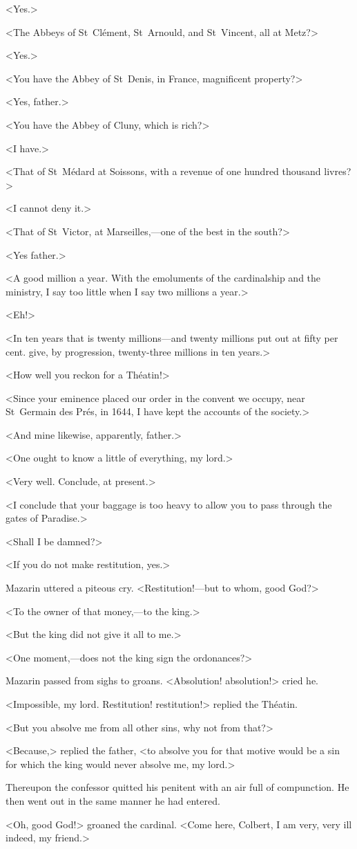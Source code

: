 <Yes.>

<The Abbeys of St~Clément, St~Arnould, and St~Vincent, all at Metz?>

<Yes.>

<You have the Abbey of St~Denis, in France, magnificent property?>

<Yes, father.>

<You have the Abbey of Cluny, which is rich?>

<I have.>

<That of St~Médard at Soissons, with a revenue of one hundred thousand livres?>

<I cannot deny it.>

<That of St~Victor, at Marseilles,—one of the best in the south?>

<Yes father.>

<A good million a year. With the emoluments of the cardinalship and the ministry, I say too little when I say two millions a year.>

<Eh!>

<In ten years that is twenty millions—and twenty millions put out at fifty per cent. give, by progression, twenty-three millions in ten years.>

<How well you reckon for a Théatin!>

<Since your eminence placed our order in the convent we occupy, near St~Germain des Prés, in 1644, I have kept the accounts of the society.>

<And mine likewise, apparently, father.>

<One ought to know a little of everything, my lord.>

<Very well. Conclude, at present.>

<I conclude that your baggage is too heavy to allow you to pass through the gates of Paradise.>

<Shall I be damned?>

<If you do not make restitution, yes.>

Mazarin uttered a piteous cry. <Restitution!—but to whom, good God?>

<To the owner of that money,—to the king.>

<But the king did not give it all to me.>

<One moment,—does not the king sign the ordonances?>

Mazarin passed from sighs to groans. <Absolution! absolution!> cried he.

<Impossible, my lord. Restitution! restitution!> replied the Théatin.

<But you absolve me from all other sins, why not from that?>

<Because,> replied the father, <to absolve you for that motive would be a sin for which the king would never absolve me, my lord.>

Thereupon the confessor quitted his penitent with an air full of compunction. He then went out in the same manner he had entered.

<Oh, good God!> groaned the cardinal. <Come here, Colbert, I am very, very ill indeed, my friend.> 